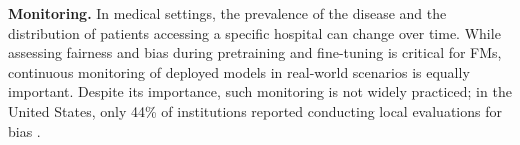 \textbf{Monitoring.} In medical settings, the prevalence of the disease and the distribution of patients accessing a specific hospital can change over time. While assessing fairness and bias during pretraining and fine-tuning is critical for FMs, continuous monitoring of deployed models in real-world scenarios is equally important. Despite its importance, such monitoring is not widely practiced; in the United States, only 44\% of institutions reported conducting local evaluations for bias \cite{nong_current_2025}.